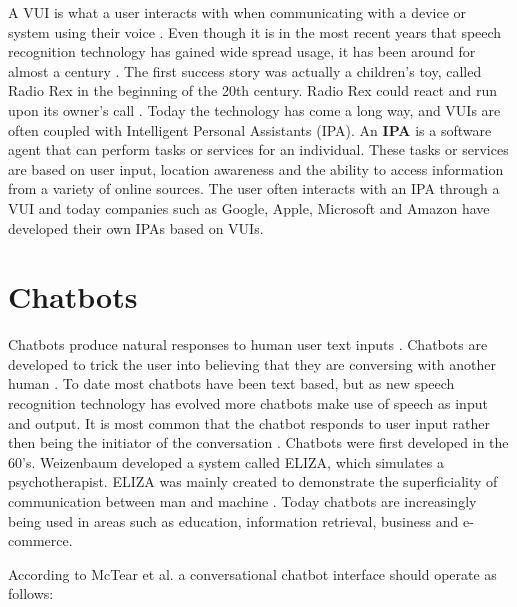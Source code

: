 A VUI is what a user interacts with when communicating with a device or system using their voice \cite{cohen2004, mctear2016}. Even though it is in the most recent years that speech recognition technology has gained wide spread usage, it has been around for almost a century \cite{cohen2004}. The first success story was actually a children’s toy, called Radio Rex in the beginning of the 20th century. Radio Rex could react and run upon its owner's call \cite{cohen2004}. Today the technology has come a long way, and VUIs are often coupled with Intelligent Personal Assistants (IPA). An \textbf{IPA} is a software agent that can perform tasks or services for an individual. These tasks or services are based on user input, location awareness and the ability to access information from a variety of online sources. The user often interacts with an IPA through a VUI and today companies such as Google, Apple, Microsoft and Amazon have developed their own IPAs based on VUIs.
% 
% 

\section{Chatbots}
Chatbots produce natural responses to human user text inputs \cite{mctear2016}. Chatbots are developed to trick the user into believing that they are conversing with another human \cite{mctear2016}. To date most chatbots have been text based, but as new speech recognition technology has evolved more chatbots make use of speech as input and output. It is most common that the chatbot responds to user input rather then being the initiator of the conversation \cite{mctear2016}. Chatbots were first developed in the 60's. Weizenbaum \cite{weizenbaum1966} developed a system called ELIZA, which simulates a psychotherapist. ELIZA was mainly created to demonstrate the superficiality of communication between man and machine \cite{mctear2016}. Today chatbots are increasingly being used in areas such as education, information retrieval, business and e-commerce.
% 
% 

According to McTear et al. \cite{mctear2016} a conversational chatbot interface should operate as follows: 

